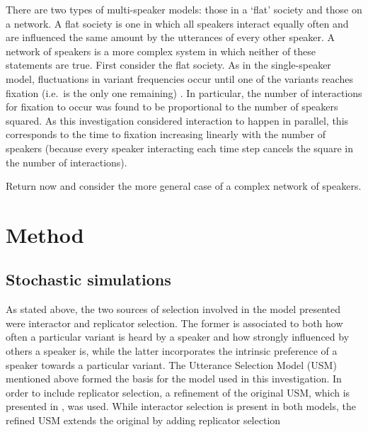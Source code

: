 \documentclass[12pt]{article}
\begin{document}
There are two types of multi-speaker models: those in a `flat' society and those on a network. A flat society is one in which all speakers interact equally often and are influenced the same amount by the utterances of every other speaker. A network of speakers is a more complex system in which neither of these statements are true. First consider the flat society. As in the single-speaker model, fluctuations in variant frequencies occur until one of the variants reaches fixation (i.e.\ is the only one remaining) \cite{USM}. In particular, the number of interactions for fixation to occur was found to be proportional to the number of speakers squared. As this investigation considered interaction to happen in parallel, this corresponds to the time to fixation increasing linearly with the number of speakers (because every speaker interacting each time step cancels the square in the number of interactions). 

Return now and consider the more general case of a complex network of speakers. 


\newpage
\section{Method}
\subsection{Stochastic simulations}
As stated above, the two sources of selection involved in the model presented were interactor and replicator selection. The former is associated to both how often a particular variant is heard by a speaker and how strongly influenced by others a speaker is, while the latter incorporates the intrinsic preference of a speaker towards a particular variant. The Utterance Selection Model (USM) mentioned above formed the basis for the model used in this investigation. In order to include replicator selection, a refinement of the original USM, which is presented in \cite{refined}, was used. While interactor selection is present in both models, the refined USM extends the original by adding replicator selection
\end{document}
